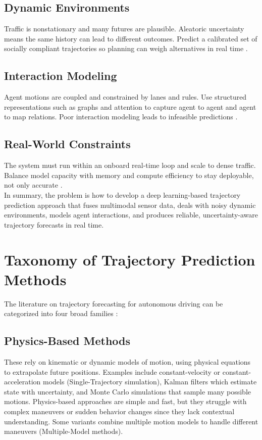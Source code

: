\documentclass[12pt,a4paper]{report}
\begin{document}
\subsection{Dynamic Environments}
\quad Traffic is nonstationary and many futures are plausible. Aleatoric uncertainty means the same history can lead to different outcomes. Predict a calibrated set of socially compliant trajectories so planning can weigh alternatives in real time \cite{madjid2025survey}.

\subsection{Interaction Modeling}
\quad Agent motions are coupled and constrained by lanes and rules. Use structured representations such as graphs and attention to capture agent to agent and agent to map relations. Poor interaction modeling leads to infeasible predictions \cite{huang2022survey}.

\subsection{Real-World Constraints}
\quad The system must run within an onboard real-time loop and scale to dense traffic. Balance model capacity with memory and compute efficiency to stay deployable, not only accurate \cite{Wayformer2022,huang2022survey}. \\

\quad In summary, the problem is how to develop a deep learning-based trajectory prediction approach that fuses multimodal sensor data, deals with noisy dynamic environments, models agent interactions, and produces reliable, uncertainty-aware trajectory forecasts in real time.

\section{Taxonomy of Trajectory Prediction Methods}
\quad The literature on trajectory forecasting for autonomous driving can be categorized into four broad families \cite{madjid2025survey}:

\subsection{Physics-Based Methods}
\quad These rely on kinematic or dynamic models of motion, using physical equations to extrapolate future positions. Examples include constant-velocity or constant-acceleration models (Single-Trajectory simulation), Kalman filters which estimate state with uncertainty, and Monte Carlo simulations that sample many possible motions. Physics-based approaches are simple and fast, but they struggle with complex maneuvers or sudden behavior changes since they lack contextual understanding. Some variants combine multiple motion models to handle different maneuvers (Multiple-Model methods).
\end{document}

